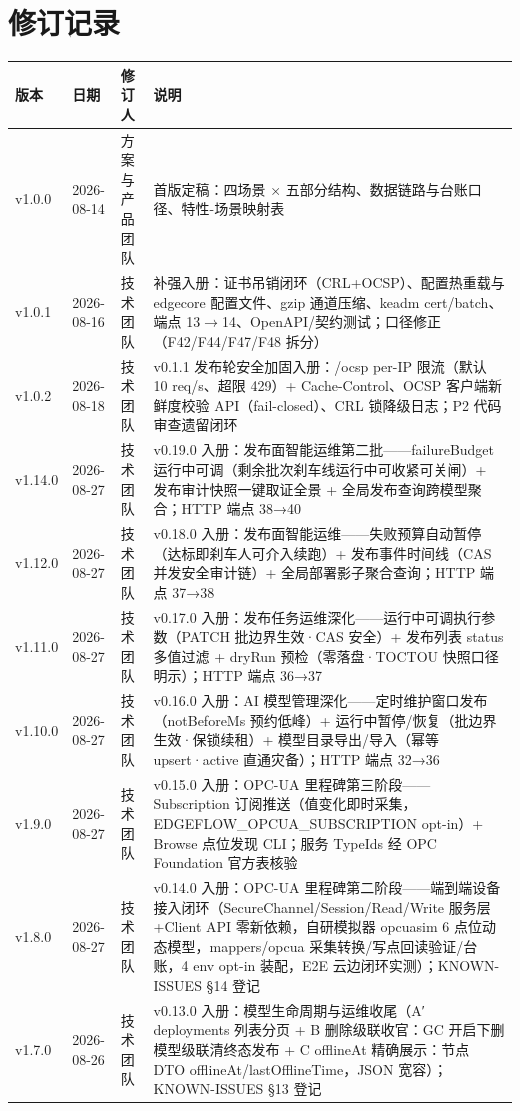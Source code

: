 \documentclass[10.5pt,a4paper,openany]{ctexbook}
\begin{document}
\chapter*{修订记录}
\begin{tabularx}{\textwidth}{p{1.4cm}p{2.2cm}p{3cm}X}
\toprule
版本 & 日期 & 修订人 & 说明\\
\midrule
v1.0.0 & 2026-08-14 & 方案与产品团队 & 首版定稿：四场景 × 五部分结构、数据链路与台账口径、特性-场景映射表\\
v1.0.1 & 2026-08-16 & 技术团队 & 补强入册：证书吊销闭环（CRL+OCSP）、配置热重载与 edgecore 配置文件、gzip 通道压缩、keadm cert/batch、端点 13$\rightarrow$14、OpenAPI/契约测试；口径修正（F42/F44/F47/F48 拆分）\\
v1.0.2 & 2026-08-18 & 技术团队 & v0.1.1 发布轮安全加固入册：/ocsp per-IP 限流（默认 10 req/s、超限 429）+ Cache-Control、OCSP 客户端新鲜度校验 API（fail-closed）、CRL 锁降级日志；P2 代码审查遗留闭环\\
v1.14.0 & 2026-08-27 & 技术团队 & v0.19.0 入册：发布面智能运维第二批——failureBudget 运行中可调（剩余批次刹车线运行中可收紧可关闸）+ 发布审计快照一键取证全景 + 全局发布查询跨模型聚合；HTTP 端点 38→40\\
v1.12.0 & 2026-08-27 & 技术团队 & v0.18.0 入册：发布面智能运维——失败预算自动暂停（达标即刹车人可介入续跑）+ 发布事件时间线（CAS 并发安全审计链）+ 全局部署影子聚合查询；HTTP 端点 37→38\\
v1.11.0 & 2026-08-27 & 技术团队 & v0.17.0 入册：发布任务运维深化——运行中可调执行参数（PATCH 批边界生效·CAS 安全）+ 发布列表 status 多值过滤 + dryRun 预检（零落盘·TOCTOU 快照口径明示）；HTTP 端点 36→37\\
v1.10.0 & 2026-08-27 & 技术团队 & v0.16.0 入册：AI 模型管理深化——定时维护窗口发布（notBeforeMs 预约低峰）+ 运行中暂停/恢复（批边界生效·保锁续租）+ 模型目录导出/导入（幂等 upsert·active 直通灾备）；HTTP 端点 32→36\\
v1.9.0 & 2026-08-27 & 技术团队 & v0.15.0 入册：OPC-UA 里程碑第三阶段——Subscription 订阅推送（值变化即时采集，EDGEFLOW\_OPCUA\_SUBSCRIPTION opt-in）+ Browse 点位发现 CLI；服务 TypeIds 经 OPC Foundation 官方表核验\\
v1.8.0 & 2026-08-27 & 技术团队 & v0.14.0 入册：OPC-UA 里程碑第二阶段——端到端设备接入闭环（SecureChannel/Session/Read/Write 服务层+Client API 零新依赖，自研模拟器 opcuasim 6 点位动态模型，mappers/opcua 采集转换/写点回读验证/台账，4 env opt-in 装配，E2E 云边闭环实测）；KNOWN-ISSUES §14 登记\\
v1.7.0 & 2026-08-26 & 技术团队 & v0.13.0 入册：模型生命周期与运维收尾（A′ deployments 列表分页 + B 删除级联收官：GC 开启下删模型级联清终态发布 + C offlineAt 精确展示：节点 DTO offlineAt/lastOfflineTime，JSON 宽容）；KNOWN-ISSUES §13 登记\\

\end{tabularx}
\end{document}
